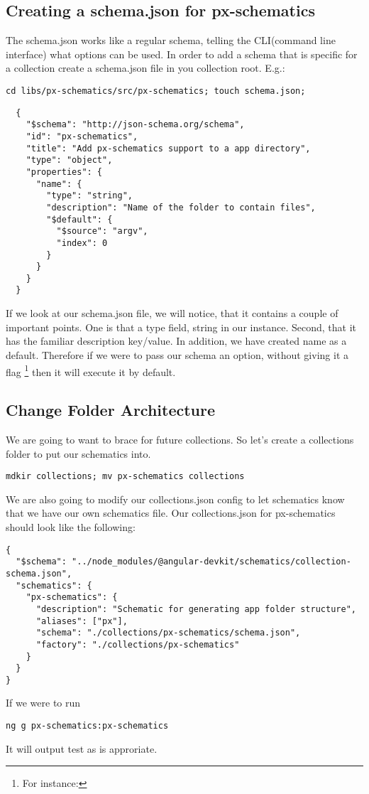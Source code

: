 \subsection{ Creating a schema.json for px-schematics }
The schema.json works like a regular schema, telling the CLI(command line
interface) what options can be used. In order to add a schema that is specific
for a collection create a schema.json file in you collection root. E.g.:
\begin{verbatim}
cd libs/px-schematics/src/px-schematics; touch schema.json;
\end{verbatim}

\begin{lstlisting}
  {
    "$schema": "http://json-schema.org/schema",
    "id": "px-schematics",
    "title": "Add px-schematics support to a app directory",
    "type": "object",
    "properties": {
      "name": {
        "type": "string",
        "description": "Name of the folder to contain files",
        "$default": {
          "$source": "argv",
          "index": 0
        }
      }
    }
  }
\end{lstlisting}
If we look at our schema.json file, we will notice, that it contains a couple
of important points. One is that a type field, string in our instance. Second,
that it has the familiar description key/value. In addition, we have created
name as a default. Therefore if we were to pass our schema an option, without
giving it a flag \footnote{For instance: }
then it will execute it by default.

\subsection{ Change Folder Architecture }
We are going to want to brace for future collections. So let's create a
collections folder to put our schematics into.
\begin{verbatim}
mdkir collections; mv px-schematics collections
\end{verbatim}

We are also going to modify our collections.json config to let schematics know
that we have our own schematics file. Our collections.json for px-schematics
should look like the following:

\begin{lstlisting}
{
  "$schema": "../node_modules/@angular-devkit/schematics/collection-schema.json",
  "schematics": {
    "px-schematics": {
      "description": "Schematic for generating app folder structure",
      "aliases": ["px"],
      "schema": "./collections/px-schematics/schema.json",
      "factory": "./collections/px-schematics"
    }
  }
}
\end{lstlisting}

If we were to run
\begin{verbatim}
ng g px-schematics:px-schematics
\end{verbatim}

It will output test as is approriate.
